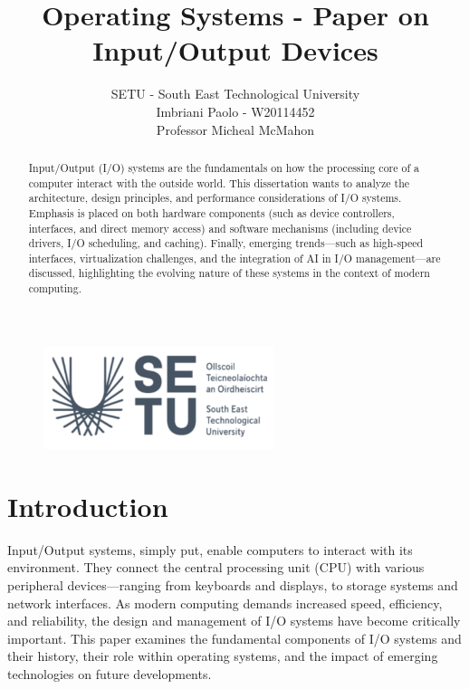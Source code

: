 \documentclass[a4paper]{article}
\title{Operating Systems - Paper on Input/Output Devices}
\author{SETU - South East Technological University\\Imbriani Paolo - W20114452\\Professor Micheal McMahon}
\begin{document}
\begin{figure}
    \centering
    \includegraphics[width=0.6\textwidth]{SETU.png}
    \label{fig:centered-image}
\end{figure}

\maketitle 

\begin{abstract}
    Input/Output (I/O) systems are the fundamentals on how the processing core of a computer interact with the outside world. This dissertation wants to analyze the architecture, design principles, and 
    performance considerations of I/O systems. Emphasis is placed on both hardware components
     (such as device controllers, interfaces, and direct memory access) and software mechanisms 
     (including device drivers, I/O scheduling, and caching). Finally, emerging trends—such as 
     high-speed interfaces, virtualization challenges, and the integration of AI in I/O management—are 
     discussed, highlighting the evolving nature of these systems in the context of modern computing.
\end{abstract}


\pagebreak

\tableofcontents

\pagebreak

\section*{Introduction}

Input/Output systems, simply put, enable computers to interact with its environment.
They connect the central processing unit (CPU) with various peripheral devices—ranging from 
keyboards and displays, to storage systems and network interfaces. As modern computing demands 
increased speed, efficiency, and reliability, the design and management of I/O systems have become 
critically important. This paper examines the fundamental components of I/O systems and their history, their role 
within operating systems, and the impact of emerging technologies on future developments.
\end{document}
